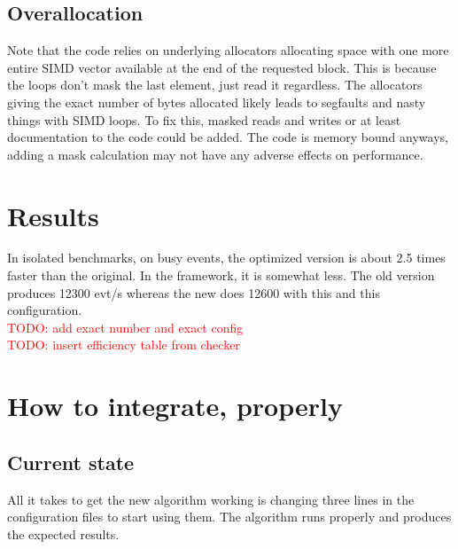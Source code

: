 \documentclass[12pt]{article}
\begin{document}
\subsection{Overallocation}

Note that the code relies on underlying allocators allocating space with one more entire SIMD vector available at the end of the requested block. This is because the loops don't mask the last element, just read it regardless. The allocators giving the exact number of bytes allocated likely leads to segfaults and nasty things with SIMD loops. To fix this, masked reads and writes or at least documentation to the code could be added. The code is memory bound anyways, adding a mask calculation may not have any adverse effects on performance.



\section{Results}


In isolated benchmarks, on busy events, the optimized version is about 2.5 times faster than the original. In the framework, it is somewhat less. The old version produces 12300 evt/s whereas the new does 12600 with this and this configuration. \\
\textcolor{red}{TODO: add exact number and exact config}\\
\textcolor{red}{TODO: insert efficiency table from checker}



\newpage
\section{How to integrate, properly}

\subsection{Current state}

All it takes to get the new algorithm working is changing three lines in the configuration files to start using them. The algorithm runs properly and produces the expected results.
\end{document}
